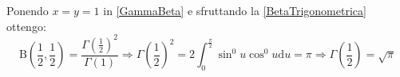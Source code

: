 \begin{remark}
	Ponendo $x=y=1$ in \ref{GammaBeta} e sfruttando la \ref{BetaTrigonometrica} ottengo:
	\begin{equation*}
		\mathrm{B}\left(\frac12,\frac12\right)=\dfrac{\Gamma\left(\frac12\right)^2}{\Gamma(1)}\Rightarrow 
		\Gamma\left(\frac12\right)^2=2\int_0^{\frac{\pi}2}\sin^0u\cos^0u\mathrm{d}u=\pi\Rightarrow \Gamma\left(\frac12\right)=\sqrt{\pi}
	\end{equation*}
\end{remark}